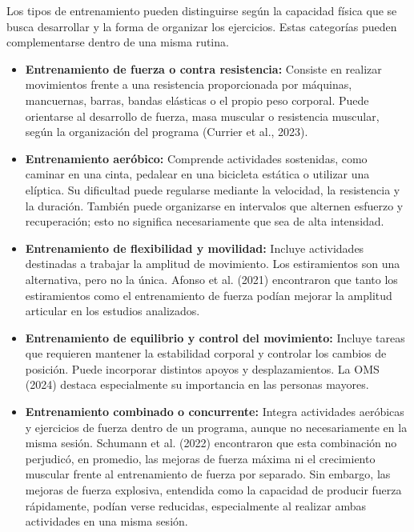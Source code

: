 Los tipos de entrenamiento pueden distinguirse según la capacidad física que se
busca desarrollar y la forma de organizar los ejercicios. Estas categorías
pueden complementarse dentro de una misma rutina.

\begin{itemize}
    \item \textbf{Entrenamiento de fuerza o contra resistencia:}
    Consiste en realizar movimientos frente a una resistencia proporcionada por
    máquinas, mancuernas, barras, bandas elásticas o el propio peso corporal.
    Puede orientarse al desarrollo de fuerza, masa muscular o resistencia
    muscular, según la organización del programa (Currier et al., 2023).

    \item \textbf{Entrenamiento aeróbico:}
    Comprende actividades sostenidas, como caminar en una cinta, pedalear en
    una bicicleta estática o utilizar una elíptica. Su dificultad puede
    regularse mediante la velocidad, la resistencia y la duración. También
    puede organizarse en intervalos que alternen esfuerzo y recuperación; esto
    no significa necesariamente que sea de alta intensidad.

    \item \textbf{Entrenamiento de flexibilidad y movilidad:}
    Incluye actividades destinadas a trabajar la amplitud de movimiento. Los
    estiramientos son una alternativa, pero no la única. Afonso et al. (2021)
    encontraron que tanto los estiramientos como el entrenamiento de fuerza
    podían mejorar la amplitud articular en los estudios analizados.

    \item \textbf{Entrenamiento de equilibrio y control del movimiento:}
    Incluye tareas que requieren mantener la estabilidad corporal y controlar
    los cambios de posición. Puede incorporar distintos apoyos y
    desplazamientos. La OMS (2024) destaca especialmente su importancia en las
    personas mayores.

    \item \textbf{Entrenamiento combinado o concurrente:}
    Integra actividades aeróbicas y ejercicios de fuerza dentro de un programa,
    aunque no necesariamente en la misma sesión. Schumann et al. (2022)
    encontraron que esta combinación no perjudicó, en promedio, las mejoras de
    fuerza máxima ni el crecimiento muscular frente al entrenamiento de fuerza
    por separado. Sin embargo, las mejoras de fuerza explosiva, entendida como
    la capacidad de producir fuerza rápidamente, podían verse reducidas,
    especialmente al realizar ambas actividades en una misma sesión.
\end{itemize}


